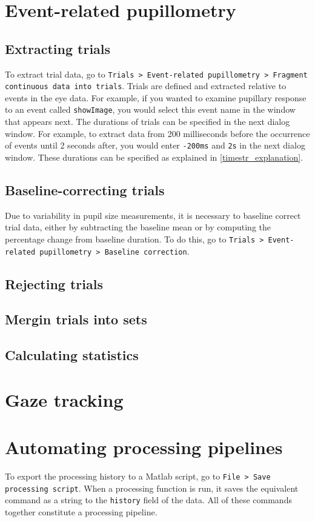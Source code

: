 \documentclass{article}
\begin{document}
\section{Event-related pupillometry}
\subsection{Extracting trials}
To extract trial data, go to \texttt{Trials > Event-related pupillometry > Fragment continuous data into trials}. Trials are defined and extracted relative to events in the eye data. For example, if you wanted to examine pupillary response to an event called \texttt{showImage}, you would select this event name in the window that appears next. The durations of trials can be specified in the next dialog window. For example, to extract data from 200 milliseconds before the occurrence of events until 2 seconds after, you would enter \texttt{-200ms} and \texttt{2s} in the next dialog window. These durations can be specified as explained in \ref{timestr_explanation}.
\subsection{Baseline-correcting trials}
Due to variability in pupil size measurements, it is necessary to baseline correct trial data, either by subtracting the baseline mean or by computing the percentage change from baseline duration. To do this, go to \texttt{Trials > Event-related pupillometry > Baseline correction}. 
\subsection{Rejecting trials}
\subsection{Mergin trials into sets}
\subsection{Calculating statistics}

\section{Gaze tracking}

\section{Automating processing pipelines}
To export the processing history to a Matlab script, go to \texttt{File > Save processing script}. When a processing function is run, it saves the equivalent command as a string to the \texttt{history} field of the data. All of these commands together constitute a processing pipeline.
\end{document}
